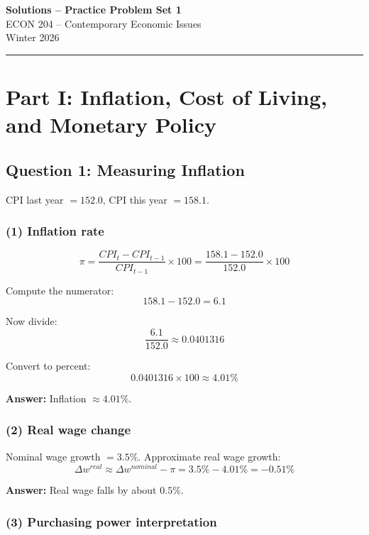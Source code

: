 \documentclass[11pt]{article}
\begin{document}
\begin{center}
{\Large \textbf{Solutions -- Practice Problem Set 1}}\\
\vspace{1em}
{\large ECON 204 -- Contemporary Economic Issues}\\
\vspace{1em}
{\large Winter 2026}
\end{center}
\hrule
\vspace{1em}

\section*{Part I: Inflation, Cost of Living, and Monetary Policy}

\subsection*{Question 1: Measuring Inflation}

CPI last year \(=152.0\), CPI this year \(=158.1\).

\subsubsection*{(1) Inflation rate}

\[
\pi=\frac{CPI_t-CPI_{t-1}}{CPI_{t-1}}\times 100
=\frac{158.1-152.0}{152.0}\times 100
\]

Compute the numerator:
\[
158.1-152.0=6.1
\]

Now divide:
\[
\frac{6.1}{152.0}\approx 0.0401316
\]

Convert to percent:
\[
0.0401316\times 100\approx 4.01\%
\]

\textbf{Answer:} Inflation \(\approx 4.01\%\).

\subsubsection*{(2) Real wage change}

Nominal wage growth \(=3.5\%\). Approximate real wage growth:
\[
\Delta w^{real}\approx \Delta w^{nominal}-\pi
=3.5\%-4.01\%=-0.51\%
\]

\textbf{Answer:} Real wage falls by about \(0.5\%\).

\subsubsection*{(3) Purchasing power interpretation}
\end{document}
